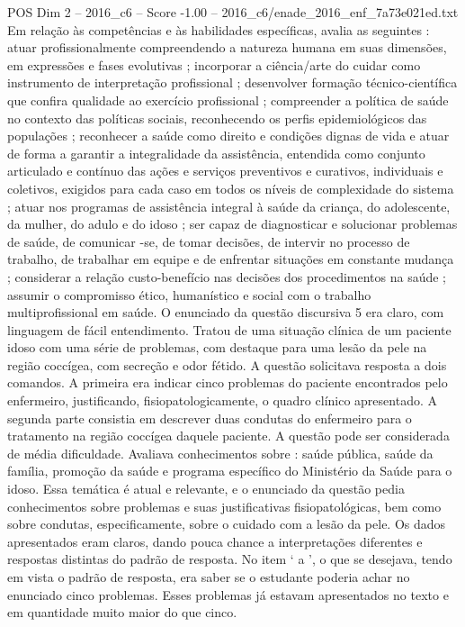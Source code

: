 \begin{textsample}{POS Dim 2 – 2016\_c6 – Score -1.00 – 2016\_c6/enade\_2016\_enf\_7a73e021ed.txt}
Em relação às competências e às habilidades específicas, avalia as seguintes : atuar profissionalmente compreendendo a natureza humana em suas dimensões, em expressões e fases evolutivas ; incorporar a ciência/arte do cuidar como instrumento de interpretação profissional ; desenvolver formação técnico-científica que confira qualidade ao exercício profissional ; compreender a política de saúde no contexto das políticas sociais, reconhecendo os perfis epidemiológicos das populações ; reconhecer a saúde como direito e condições dignas de vida e atuar de forma a garantir a integralidade da assistência, entendida como conjunto articulado e contínuo das ações e serviços preventivos e curativos, individuais e coletivos, exigidos para cada caso em todos os níveis de complexidade do sistema ; atuar nos programas de assistência integral à saúde da criança, do adolescente, da mulher, do adulo e do idoso ; ser capaz de diagnosticar e solucionar problemas de saúde, de comunicar -se, de tomar decisões, de intervir no processo de trabalho, de trabalhar em equipe e de enfrentar situações em constante mudança ; considerar a relação custo-benefício nas decisões dos procedimentos na saúde ; assumir o compromisso ético, humanístico e social com o trabalho multiprofissional em saúde.
O enunciado da questão discursiva 5 era claro, com linguagem de fácil entendimento.
Tratou de uma situação clínica de um paciente idoso com uma série de problemas, com destaque para uma lesão da pele na região coccígea, com secreção e odor fétido.
A questão solicitava resposta a dois comandos.
A primeira era indicar cinco problemas do paciente encontrados pelo enfermeiro, justificando, fisiopatologicamente, o quadro clínico apresentado.
A segunda parte consistia em descrever duas condutas do enfermeiro para o tratamento na região coccígea daquele paciente.
A questão pode ser considerada de média dificuldade.
Avaliava conhecimentos sobre : saúde pública, saúde da família, promoção da saúde e programa específico do Ministério da Saúde para o idoso.
Essa temática é atual e relevante, e o enunciado da questão pedia conhecimentos sobre problemas e suas justificativas fisiopatológicas, bem como sobre condutas, especificamente, sobre o cuidado com a lesão da pele.
Os dados apresentados eram claros, dando pouca chance a interpretações diferentes e respostas distintas do padrão de resposta.
No item ‘ a ’, o que se desejava, tendo em vista o padrão de resposta, era saber se o estudante poderia achar no enunciado cinco problemas.
Esses problemas já estavam apresentados no texto e em quantidade muito maior do que cinco.

\end{textsample}
